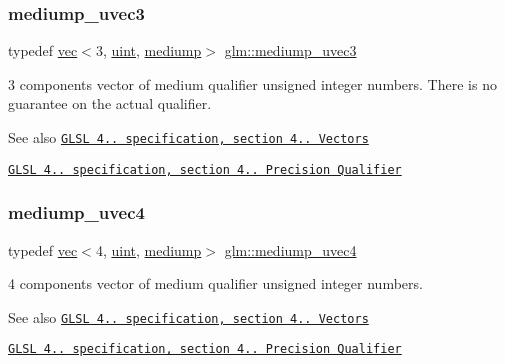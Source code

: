 \subsubsection{\texorpdfstring{mediump\+\_\+uvec3}{mediump\_uvec3}}
{\footnotesize\ttfamily typedef \mbox{\hyperlink{structglm_1_1vec}{vec}}$<$3, \mbox{\hyperlink{group__core__precision_ga4fd29415871152bfb5abd588334147c8}{uint}}, \mbox{\hyperlink{namespaceglm_a36ed105b07c7746804d7fdc7cc90ff25a6416f3ea0c9025fb21ed50c4d6620482}{mediump}}$>$ \mbox{\hyperlink{group__core__precision_ga0eaf34ab9ebc5e2c92cd6d6d5aa272f4}{glm\+::mediump\+\_\+uvec3}}}

3 components vector of medium qualifier unsigned integer numbers. There is no guarantee on the actual qualifier.

\begin{DoxySeeAlso}{See also}
\href{http://www.opengl.org/registry/doc/GLSLangSpec.4.20.8.pdf}{\tt G\+L\+SL 4.. specification, section 4.. Vectors} 

\href{http://www.opengl.org/registry/doc/GLSLangSpec.4.20.8.pdf}{\tt G\+L\+SL 4.. specification, section 4.. Precision Qualifier} 
\end{DoxySeeAlso}
\mbox{\label{group__core__precision_ga204494f26e258e26882acf5288415ebd}} 
\subsubsection{\texorpdfstring{mediump\+\_\+uvec4}{mediump\_uvec4}}
{\footnotesize\ttfamily typedef \mbox{\hyperlink{structglm_1_1vec}{vec}}$<$4, \mbox{\hyperlink{group__core__precision_ga4fd29415871152bfb5abd588334147c8}{uint}}, \mbox{\hyperlink{namespaceglm_a36ed105b07c7746804d7fdc7cc90ff25a6416f3ea0c9025fb21ed50c4d6620482}{mediump}}$>$ \mbox{\hyperlink{group__core__precision_ga204494f26e258e26882acf5288415ebd}{glm\+::mediump\+\_\+uvec4}}}

4 components vector of medium qualifier unsigned integer numbers.

\begin{DoxySeeAlso}{See also}
\href{http://www.opengl.org/registry/doc/GLSLangSpec.4.20.8.pdf}{\tt G\+L\+SL 4.. specification, section 4.. Vectors} 

\href{http://www.opengl.org/registry/doc/GLSLangSpec.4.20.8.pdf}{\tt G\+L\+SL 4.. specification, section 4.. Precision Qualifier} 
\end{DoxySeeAlso}
\mbox{\label{group__core__precision_ga96e0011dd4d124d28fd52ef2f0c6f299}} 
